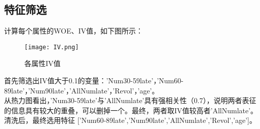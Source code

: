 \subsection{特征筛选}
计算每个属性的WOE、IV值，如下图所示：
\begin{figure}[H]
	\centering
	\texttt{[image: IV.png]}
	\caption{各属性IV值}
	\label{fig:iv}
\end{figure}

首先筛选出IV值大于0.1的变量：'Num30-59late'，'Num60-89late'，'Num90late'，'AllNumlate'，'Revol'，'age'。\\

从热力图看出，'Num30-59late'与'AllNumlate'具有强相关性（0.7），说明两者表征的信息具有较大的重叠，可以删掉一个。最终，两者取IV值较高者'AllNumlate'。
清洗后，最终选用特征 ['Num60-89late','Num90late','AllNumlate','Revol','age']。





